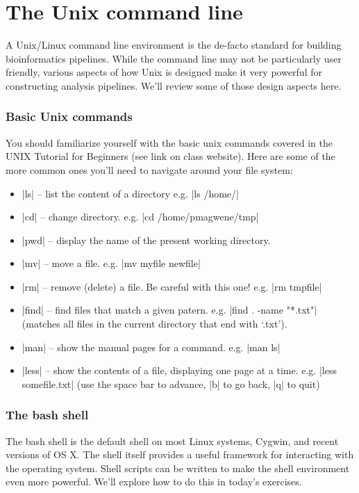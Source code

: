 \section{The Unix command line}

A Unix/Linux command line environment is the de-facto standard for building bioinformatics pipelines. While the command line may not be particularly user friendly, various aspects of how Unix is designed make it very powerful for constructing analysis pipelines.  We'll review some of those design aspects here.

\subsubsection{Basic Unix commands}

You should familiarize yourself with the basic unix commands covered in the UNIX Tutorial for Beginners (see link on class website).  Here are some of the more common ones you'll need to navigate around your file system:

\begin{itemize}
\item |ls| -- list the content of a directory e.g. |ls /home/|
\item |cd| -- change directory.  e.g. |cd /home/pmagwene/tmp|
\item |pwd| -- display the name of the present working directory.
\item |mv| -- move a file. e.g. |mv myfile newfile|
\item |rm| -- remove (delete) a file. Be careful with this one! e.g. |rm tmpfile|
\item |find| -- find files that match a given patern. e.g. |find . -name "*.txt"| (matches all files in the current directory that end with `.txt').
\item |man| -- show the manual pages for a command. e.g. |man ls|
\item |less| -- show the contents of a file, displaying one page at a time. e.g. |less somefile.txt| (use the space bar to advance, |b| to go back, |q| to quit)
\end{itemize}


\subsubsection{The bash shell}

The bash shell is the default shell on most Linux systems, Cygwin, and recent versions of OS X.  The shell itself provides a useful framework for interacting with the operating system. Shell scripts can be written to make the shell environment even more powerful. We'll explore how to do this in today's exercises. 

